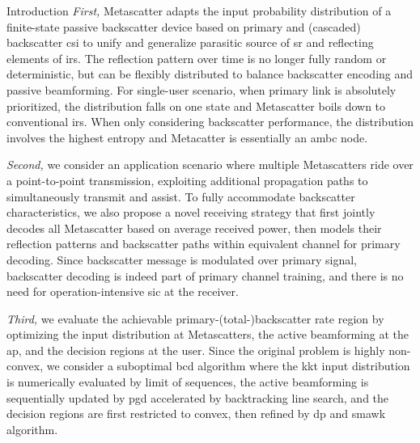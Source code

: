 \documentclass[journal]{IEEEtran}
\begin{document}
\begin{section}{Introduction}
	\emph{First,} Metascatter adapts the input probability distribution of a finite-state passive backscatter device based on primary and (cascaded) backscatter \gls{csi} to unify and generalize parasitic source of \gls{sr} and reflecting elements of \gls{irs}.
	The reflection pattern over time is no longer fully random or deterministic, but can be flexibly distributed to balance backscatter encoding and passive beamforming.
	For single-user scenario, when primary link is absolutely prioritized, the distribution falls on one state and Metascatter boils down to conventional \gls{irs}.
	When only considering backscatter performance, the distribution involves the highest entropy and Metacatter is essentially an \gls{ambc} node.

	\emph{Second,} we consider an application scenario where multiple Metascatters ride over a point-to-point transmission, exploiting additional propagation paths to simultaneously transmit and assist.
	To fully accommodate backscatter characteristics, we also propose a novel receiving strategy that first jointly decodes all Metascatter based on average received power, then models their reflection patterns and backscatter paths within equivalent channel for primary decoding.
	Since backscatter message is modulated over primary signal, backscatter decoding is indeed part of primary channel training, and there is no need for operation-intensive \gls{sic} at the receiver.


	\emph{Third,} we evaluate the achievable primary-(total-)backscatter rate region by optimizing the input distribution at Metascatters, the active beamforming at the \gls{ap}, and the decision regions at the user. Since the original problem is highly non-convex, we consider a suboptimal \gls{bcd} algorithm where the \gls{kkt} input distribution is numerically evaluated by limit of sequences, the active beamforming is sequentially updated by \gls{pgd} accelerated by backtracking line search, and the decision regions are first restricted to convex, then refined by \gls{dp} and \gls{smawk} algorithm.


\end{section}
\end{document}
